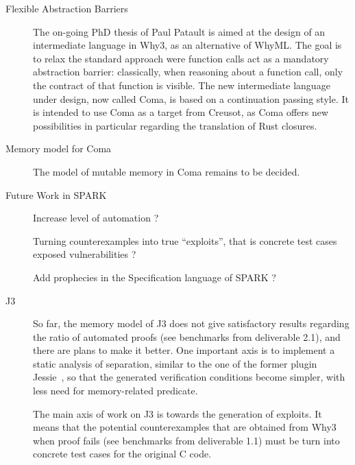 \documentclass[a4paper,11pt]{article}
\begin{document}
\begin{description}
\item[Flexible Abstraction Barriers]

  The on-going PhD thesis of Paul Patault is aimed at the design of an
  intermediate language in Why3, as an alternative of WhyML. The goal is to
  relax the standard approach were function calls act as a mandatory abstraction
  barrier: classically, when reasoning about a function call, only the contract
  of that function is visible. The new intermediate language under design, now
  called Coma, is based on a continuation passing style. It is intended to use
  Coma as a target from Creusot, as Coma offers new possibilities in particular
  regarding the translation of Rust closures.

\item[Memory model for Coma]

  The model of mutable memory in Coma remains to be decided.

\item[Future Work in SPARK]


  Increase level of automation ?

  Turning counterexamples into true ``exploits'', that is concrete test cases
  exposed vulnerabilities ?

  Add prophecies in the Specification language of SPARK ?

\item[J3]


  So far, the memory model of J3 does not give satisfactory results regarding
  the ratio of automated proofs (see benchmarks from deliverable 2.1), and
  there are plans to make it better. One important axis is to implement a static
  analysis of separation, similar to the one of the former plugin
  Jessie~\cite{hubert2008these,hubert07hav}, so that the generated verification
  conditions become simpler, with less need for memory-related predicate.

  The main axis of work on J3 is towards the generation of exploits. It means
  that the potential counterexamples that are obtained from Why3 when proof
  fails (see benchmarks from deliverable 1.1) must be turn into concrete test
  cases for the original C code.


\end{description}
\end{document}
